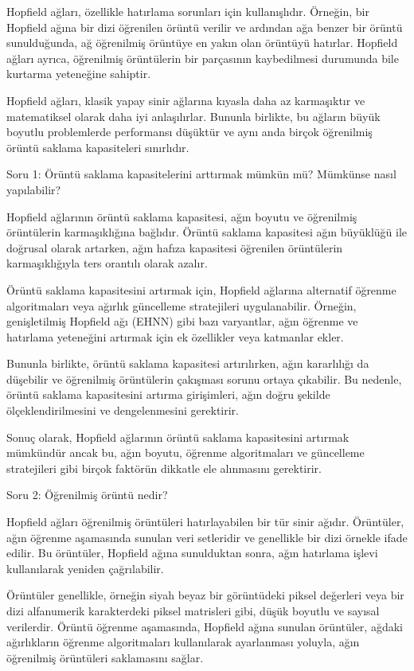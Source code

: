 \documentclass[11pt]{article}
\begin{document}
Hopfield ağları, özellikle hatırlama sorunları için kullanışlıdır. Örneğin, bir Hopfield ağına bir dizi öğrenilen örüntü verilir ve ardından ağa benzer bir örüntü sunulduğunda, ağ öğrenilmiş örüntüye en yakın olan örüntüyü hatırlar. Hopfield ağları ayrıca, öğrenilmiş örüntülerin bir parçasının kaybedilmesi durumunda bile kurtarma yeteneğine sahiptir.

Hopfield ağları, klasik yapay sinir ağlarına kıyasla daha az karmaşıktır ve matematiksel olarak daha iyi anlaşılırlar. Bununla birlikte, bu ağların büyük boyutlu problemlerde performansı düşüktür ve aynı anda birçok öğrenilmiş örüntü saklama kapasiteleri sınırlıdır.

Soru 1: Örüntü saklama kapasitelerini arttırmak mümkün mü? Mümkünse nasıl yapılabilir?

Hopfield ağlarının örüntü saklama kapasitesi, ağın boyutu ve öğrenilmiş örüntülerin karmaşıklığına bağlıdır. Örüntü saklama kapasitesi ağın büyüklüğü ile doğrusal olarak artarken, ağın hafıza kapasitesi öğrenilen örüntülerin karmaşıklığıyla ters orantılı olarak azalır.

Örüntü saklama kapasitesini artırmak için, Hopfield ağlarına alternatif öğrenme algoritmaları veya ağırlık güncelleme stratejileri uygulanabilir. Örneğin, genişletilmiş Hopfield ağı (EHNN) gibi bazı varyantlar, ağın öğrenme ve hatırlama yeteneğini artırmak için ek özellikler veya katmanlar ekler.

Bununla birlikte, örüntü saklama kapasitesi artırılırken, ağın kararlılığı da düşebilir ve öğrenilmiş örüntülerin çakışması sorunu ortaya çıkabilir. Bu nedenle, örüntü saklama kapasitesini artırma girişimleri, ağın doğru şekilde ölçeklendirilmesini ve dengelenmesini gerektirir.

Sonuç olarak, Hopfield ağlarının örüntü saklama kapasitesini artırmak mümkündür ancak bu, ağın boyutu, öğrenme algoritmaları ve güncelleme stratejileri gibi birçok faktörün dikkatle ele alınmasını gerektirir.

Soru 2: Öğrenilmiş örüntü nedir?

Hopfield ağları öğrenilmiş örüntüleri hatırlayabilen bir tür sinir ağıdır. Örüntüler, ağın öğrenme aşamasında sunulan veri setleridir ve genellikle bir dizi örnekle ifade edilir. Bu örüntüler, Hopfield ağına sunulduktan sonra, ağın hatırlama işlevi kullanılarak yeniden çağrılabilir.

Örüntüler genellikle, örneğin siyah beyaz bir görüntüdeki piksel değerleri veya bir dizi alfanumerik karakterdeki piksel matrisleri gibi, düşük boyutlu ve sayısal verilerdir. Örüntü öğrenme aşamasında, Hopfield ağına sunulan örüntüler, ağdaki ağırlıkların öğrenme algoritmaları kullanılarak ayarlanması yoluyla, ağın öğrenilmiş örüntüleri saklamasını sağlar.
\end{document}
